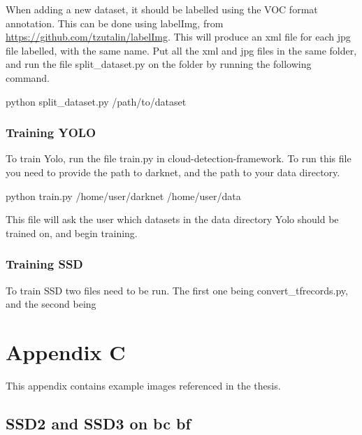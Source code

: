 
When adding a new dataset, it should be labelled using the VOC format annotation. This can be done using labelImg, from \url{https://github.com/tzutalin/labelImg}. This will produce an xml file for each jpg file labelled, with the same name. Put all the xml and jpg files in the same folder, and run the file split\_dataset.py on the folder by running the following command.

\begin{lcverbatim}
python split_dataset.py /path/to/dataset
\end{lcverbatim}




\subsection{Training YOLO}
To train Yolo, run the file train.py in cloud-detection-framework. To run this file you need to provide the path to darknet, and the path to your data directory.

\begin{lcverbatim}
python train.py /home/user/darknet /home/user/data
\end{lcverbatim}

This file will ask the user which datasets in the data directory Yolo should be trained on, and begin training. 

\subsection{Training SSD}
To train SSD two files need to be run. The first one being convert\_tfrecords.py, and the second being


\chapter{Appendix C}
This appendix contains example images referenced in the thesis.


\newpage

\section{SSD2 and SSD3 on bc bf}
\label{sec:bigbox}

